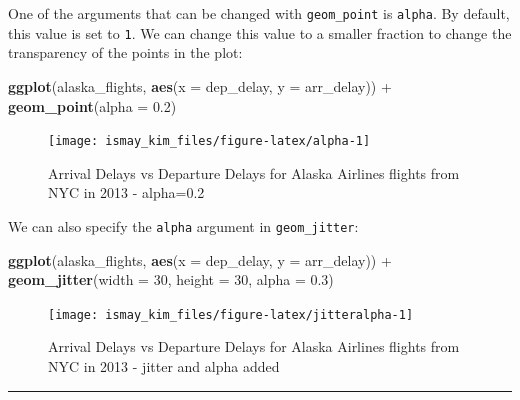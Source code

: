 \documentclass[]{tufte-book}
\newenvironment{Shaded}{\begin{snugshade}}{\end{snugshade}}
\newcommand{\KeywordTok}[1]{\textcolor[rgb]{0.13,0.29,0.53}{\textbf{{#1}}}}
\newcommand{\DataTypeTok}[1]{\textcolor[rgb]{0.13,0.29,0.53}{{#1}}}
\newcommand{\DecValTok}[1]{\textcolor[rgb]{0.00,0.00,0.81}{{#1}}}
\newcommand{\FloatTok}[1]{\textcolor[rgb]{0.00,0.00,0.81}{{#1}}}
\newcommand{\StringTok}[1]{\textcolor[rgb]{0.31,0.60,0.02}{{#1}}}
\newcommand{\NormalTok}[1]{{#1}}
\begin{document}
One of the arguments that can be changed with \texttt{geom\_point} is
\texttt{alpha}. By default, this value is set to \texttt{1}. We can
change this value to a smaller fraction to change the transparency of
the points in the plot:

\begin{Shaded}
\begin{Highlighting}[]
\KeywordTok{ggplot}\NormalTok{(alaska_flights, }\KeywordTok{aes}\NormalTok{(}\DataTypeTok{x =} \NormalTok{dep_delay, }\DataTypeTok{y =} \NormalTok{arr_delay)) +}\StringTok{ }
\StringTok{  }\KeywordTok{geom_point}\NormalTok{(}\DataTypeTok{alpha =} \FloatTok{0.2}\NormalTok{)}
\end{Highlighting}
\end{Shaded}

\begin{figure}
\texttt{[image: ismay\_kim\_files/figure-latex/alpha-1]} \caption[Arrival Delays vs Departure Delays for Alaska Airlines flights from NYC in 2013 - alpha=0]{Arrival Delays vs Departure Delays for Alaska Airlines flights from NYC in 2013 - alpha=0.2}\label{fig:alpha}
\end{figure}

We can also specify the \texttt{alpha} argument in
\texttt{geom\_jitter}:

\begin{Shaded}
\begin{Highlighting}[]
\KeywordTok{ggplot}\NormalTok{(alaska_flights, }\KeywordTok{aes}\NormalTok{(}\DataTypeTok{x =} \NormalTok{dep_delay, }\DataTypeTok{y =} \NormalTok{arr_delay)) +}\StringTok{ }
\StringTok{  }\KeywordTok{geom_jitter}\NormalTok{(}\DataTypeTok{width =} \DecValTok{30}\NormalTok{, }\DataTypeTok{height =} \DecValTok{30}\NormalTok{, }\DataTypeTok{alpha =} \FloatTok{0.3}\NormalTok{)}
\end{Highlighting}
\end{Shaded}

\begin{figure}
\texttt{[image: ismay\_kim\_files/figure-latex/jitteralpha-1]} \caption[Arrival Delays vs Departure Delays for Alaska Airlines flights from NYC in 2013 - jitter and alpha added]{Arrival Delays vs Departure Delays for Alaska Airlines flights from NYC in 2013 - jitter and alpha added}\label{fig:jitteralpha}
\end{figure}

\begin{center}\rule{0.5\linewidth}{\linethickness}\end{center}
\end{document}

